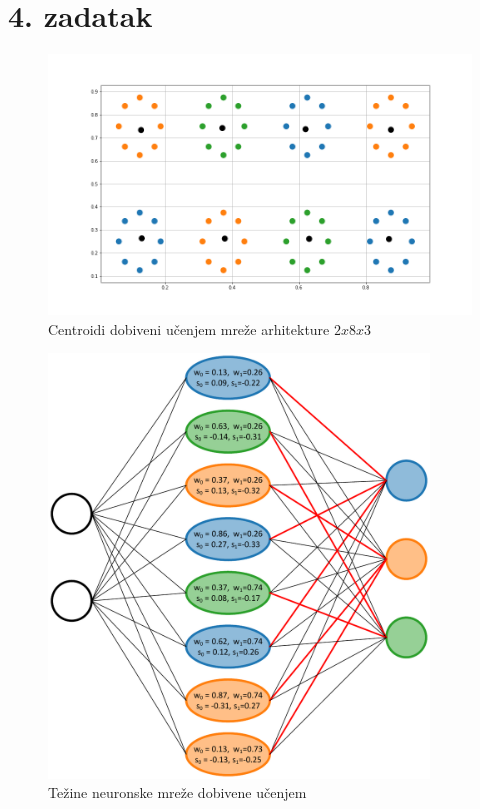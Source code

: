\documentclass[12pt, a4paper, numeric]{article}
\begin{document}
\section*{4. zadatak}
\begin{figure}[ht!] 
    \centering
    \includegraphics[width=1\textwidth]{img/zadatak4}
    \captionsetup{justification=centering}
    \caption{Centroidi dobiveni učenjem mreže arhitekture $2x8x3$}
    \label{fig:zad4}
\end{figure}
\begin{figure}[ht!] 
    \centering
    \includegraphics[width=0.9\textwidth]{img/neural2}
    \captionsetup{justification=centering}
    \caption{Težine neuronske mreže dobivene učenjem}
    \label{fig:zad4b}
\end{figure}
\end{document}
